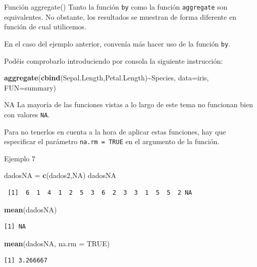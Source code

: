 \documentclass[
  ignorenonframetext,
]{beamer}
\newenvironment{Shaded}{\begin{snugshade}}{\end{snugshade}}
\newcommand{\AttributeTok}[1]{\textcolor[rgb]{0.13,0.29,0.53}{#1}}
\newcommand{\ConstantTok}[1]{\textcolor[rgb]{0.56,0.35,0.01}{#1}}
\newcommand{\FunctionTok}[1]{\textcolor[rgb]{0.13,0.29,0.53}{\textbf{#1}}}
\newcommand{\NormalTok}[1]{#1}
\newcommand{\OtherTok}[1]{\textcolor[rgb]{0.56,0.35,0.01}{#1}}
\newcommand{\SpecialCharTok}[1]{\textcolor[rgb]{0.81,0.36,0.00}{\textbf{#1}}}
\begin{document}
\begin{frame}[fragile]{Función aggregate()}
\label{funciuxf3n-aggregate}
Tanto la función \texttt{by} como la función \texttt{aggregate} son
equivalentes. No obstante, los resultados se muestran de forma diferente
en función de cual utilicemos.

En el caso del ejemplo anterior, convenía más hacer uso de la función
\texttt{by}.

Podéis comprobarlo introduciendo por consola la siguiente instrucción:

\begin{Shaded}
\begin{Highlighting}[]
\FunctionTok{aggregate}\NormalTok{(}\FunctionTok{cbind}\NormalTok{(Sepal.Length,Petal.Length)}\SpecialCharTok{\textasciitilde{}}\NormalTok{Species, }\AttributeTok{data=}\NormalTok{iris, }\AttributeTok{FUN=}\NormalTok{summary)}
\end{Highlighting}
\end{Shaded}
\end{frame}

\begin{frame}[fragile]{NA}
\label{na}
La mayoría de las funciones vistas a lo largo de este tema no funcionan
bien con valores \texttt{NA}.

Para no tenerlos en cuenta a la hora de aplicar estas funciones, hay que
especificar el parámetro \texttt{na.rm\ =\ TRUE} en el argumento de la
función.
\end{frame}

\begin{frame}[fragile]{Ejemplo 7}
\label{ejemplo-7}
\begin{Shaded}
\begin{Highlighting}[]
\NormalTok{dadosNA }\OtherTok{=} \FunctionTok{c}\NormalTok{(dados2,}\ConstantTok{NA}\NormalTok{)}
\NormalTok{dadosNA}
\end{Highlighting}
\end{Shaded}

\begin{verbatim}
 [1]  6  1  4  1  2  5  3  6  2  3  3  1  5  5  2 NA
\end{verbatim}

\begin{Shaded}
\begin{Highlighting}[]
\FunctionTok{mean}\NormalTok{(dadosNA)}
\end{Highlighting}
\end{Shaded}

\begin{verbatim}
[1] NA
\end{verbatim}

\begin{Shaded}
\begin{Highlighting}[]
\FunctionTok{mean}\NormalTok{(dadosNA, }\AttributeTok{na.rm =} \ConstantTok{TRUE}\NormalTok{)}
\end{Highlighting}
\end{Shaded}

\begin{verbatim}
[1] 3.266667
\end{verbatim}
\end{frame}
\end{document}
